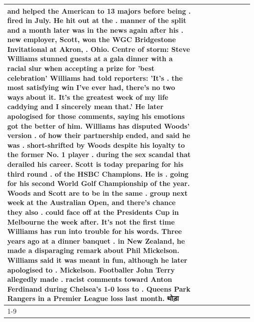 \begin{table}[H]
\begin{tabular}{lllrlllll}
and helped the American to 13 majors before being . fired in July. He hit out at the . manner of the split and a month later was in the news again after his . new employer, Scott, won the WGC Bridgestone Invitational at Akron, . Ohio. Centre of storm: Steve Williams stunned guests at a gala dinner with a racial slur when accepting a prize for 'best celebration' Williams had told reporters: 'It's . the most satisfying win I've ever had, there's no two ways about it. It's the greatest week of my life caddying and I sincerely mean that.' He later apologised for those comments, saying his emotions got the better of him. Williams has disputed Woods' version . of how their partnership ended, and said he was . short-shrifted by Woods despite his loyalty to the former No. 1 player . during the sex scandal that derailed his career. Scott is today preparing for his third round . of the HSBC Champions. He is . going for his second World Golf Championship of the year. Woods and Scott are to be in the same . group next week at the Australian Open, and there's chance they also . could face off at the Presidents Cup in Melbourne the week after. It's not the first time Williams has run into trouble for his words. Three years ago at a dinner banquet . in New Zealand, he made a disparaging remark about Phil Mickelson. Williams said it was meant in fun, although he later apologised to . Mickelson. Footballer John Terry allegedly made . racist comments toward Anton Ferdinand during Chelsea's 1-0 loss to . Queens Park Rangers in a Premier League loss last month. थोड़ा \\
\cline{1-9}

\end{tabular}
\end{table}
